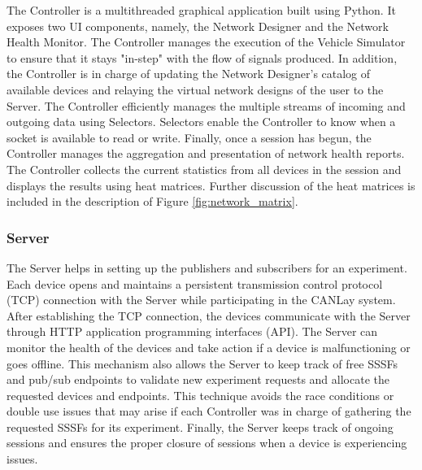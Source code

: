 \documentclass[letterpaper,twocolumn,12pt]{article}
\begin{document}
The Controller is a multithreaded graphical application built using Python. It exposes two UI components, namely, the Network Designer and the Network Health Monitor. 
The Controller manages the execution of the Vehicle Simulator to ensure that it stays "in-step" with the flow of signals produced. 
In addition, the Controller is in charge of updating the Network Designer's catalog of available devices and relaying the virtual network designs of the user to the Server. The Controller efficiently manages the multiple streams of incoming and outgoing data using Selectors. Selectors enable the Controller to know when a socket is available to read or write. Finally, once a session has begun, the Controller manages the aggregation and presentation of network health reports. The Controller collects the current statistics from all devices in the session and displays the results using heat matrices. Further discussion of the heat matrices is included in the description of Figure \ref{fig:network_matrix}.

\subsubsection{Server}
The Server helps in setting up the publishers and subscribers for an experiment. Each device opens and maintains a persistent transmission control protocol (TCP) connection with the Server while participating in the CANLay system. 
After establishing the TCP connection, the devices communicate with the Server through HTTP application programming interfaces (API). 
The Server can monitor the health of the devices and take action if a device is malfunctioning or goes offline. 
This mechanism also allows the Server to keep track of free SSSFs and pub/sub endpoints to validate new experiment requests and allocate the requested devices and endpoints. This technique avoids the race conditions or double use issues that may arise if each Controller was in charge of gathering the requested SSSFs for its experiment. 
Finally, the Server keeps track of ongoing sessions and ensures the proper closure of sessions when a device is experiencing issues.
\end{document}
